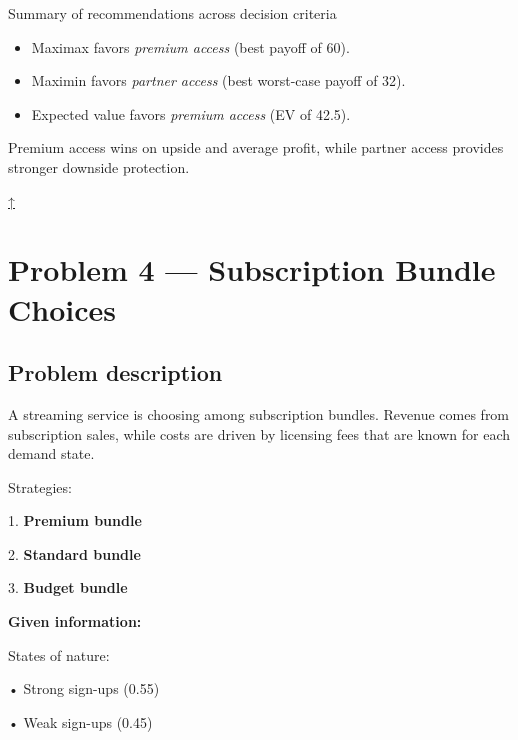 \documentclass[11pt]{article}
\begin{document}
	Summary of recommendations across decision criteria
	\begin{itemize}
		\item Maximax favors \emph{premium access} (best payoff of 60).
		\item Maximin favors \emph{partner access} (best worst-case payoff of 32).
		\item Expected value favors \emph{premium access} (EV of 42.5).
	\end{itemize}
	
	
	
	Premium access wins on upside and average profit, while partner access provides stronger downside protection.
	
	
	
	\hyperref[problem3-criteria]{↑}
	\section*{Problem 4 — Subscription Bundle Choices}
	
	\label{problem4}
	
	\subsection*{Problem description}
	
	\label{problem4-problem}
	
	A streaming service is choosing among subscription bundles. Revenue comes from subscription sales, while costs are driven by
	licensing fees that are known for each demand state.
	
	
	
	
	
	
	Strategies:
	
	
	
	1. \textbf{Premium bundle}
	
	
	
	2. \textbf{Standard bundle}
	
	
	
	3. \textbf{Budget bundle}
	
	
	
	
	
	\textbf{Given information:}
	
	
	
	States of nature:
	
	
	
	• Strong sign-ups (0.55)
	
	
	
	• Weak sign-ups (0.45)
	
\end{document}
